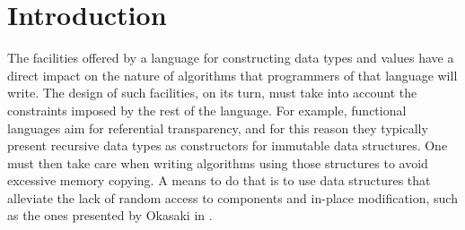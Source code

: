 \documentclass{sig-alternate}
\begin{document}



\section{Introduction}

The facilities offered by a language for constructing data types and values
have a direct impact on the nature of algorithms that programmers of that
language will write. The design of such facilities, on its turn, must take
into account the constraints imposed by the rest of the language. For example,
functional languages aim for referential transparency, and for this reason
they typically present recursive data types as constructors for immutable data
structures. One must then take care when writing algorithms using those
structures to avoid excessive memory copying. A means to do that is to use
data structures that alleviate the lack of random access to components and
in-place modification, such as the ones presented by Okasaki in
\cite{okasaki.purely}.
\end{document}
